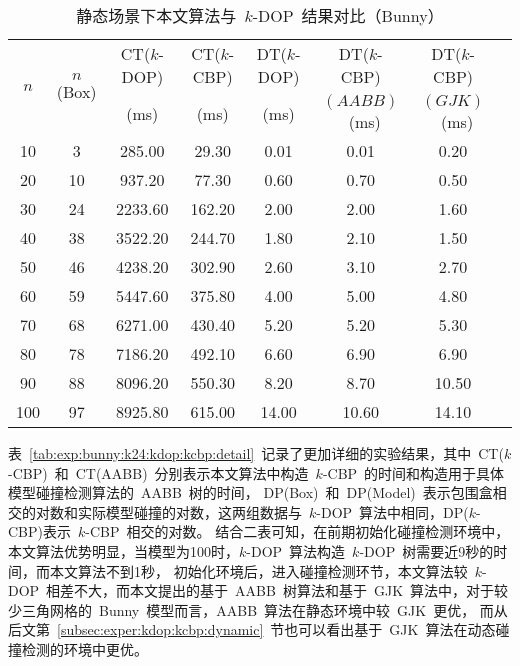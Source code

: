\begin{table}[H]  
\centering
\caption{静态场景下本文算法与~$k$-DOP~结果对比（Bunny）}
\label{tab:exp:bunny:k24:kdop:kcbp}
\begin{tabular}{cccccccc}
\toprule[1.5pt]
\multirow{2}{*}{$n$} & \multirow{2}{*}{$n$(Box)} & CT($k$-DOP) &  CT($k$-CBP) & DT($k$-DOP) & DT($k$-CBP) & DT($k$-CBP) \\%
                     &                         &  (ms)        & (ms)         & (ms)        & $(AABB)$~(ms) & $(GJK)$~(ms)       \\
\midrule[1.0pt]
10 & 3 &	285.00 &	29.30      &0.01 &	0.01  & 	0.20  \\ %
20 & 10&	937.20 &	77.30      &0.60 &	0.70  & 	0.50  \\ %
30 & 24&	2233.60&	162.20     &2.00 &	2.00  & 	1.60  \\ %
40 & 38&	3522.20&	244.70     &1.80 &	2.10  & 	1.50  \\ %
50 & 46&	4238.20&	302.90     &2.60 &	3.10  & 	2.70  \\ %
60 & 59&	5447.60&	375.80     &4.00 &	5.00  & 	4.80  \\ %
70 & 68&	6271.00&	430.40     &5.20 &	5.20  & 	5.30  \\ %
80 & 78&	7186.20&	492.10     &6.60 &	6.90  & 	6.90  \\ %
90 & 88&	8096.20&	550.30     &8.20 &	8.70  & 	10.50 \\ %
100& 97&	8925.80&	615.00     &14.00&	10.60 & 	14.10 \\ %
\bottomrule[1.5pt]
\end{tabular}
\end{table}

表~\ref{tab:exp:bunny:k24:kdop:kcbp:detail}~记录了更加详细的实验结果，其中~CT($k$-CBP)~和~CT(AABB)~分别表示本文算法中构造~$k$-CBP~的时间和构造用于具体模型碰撞检测算法的~AABB~树的时间，
DP(Box)~和~DP(Model)~表示包围盒相交的对数和实际模型碰撞的对数，这两组数据与~$k$-DOP~算法中相同，DP($k$-CBP)表示~$k$-CBP~相交的对数。
结合二表可知，在前期初始化碰撞检测环境中，本文算法优势明显，当模型为100时，$k$-DOP~算法构造~$k$-DOP~树需要近9秒的时间，而本文算法不到1秒，
初始化环境后，进入碰撞检测环节，本文算法较~$k$-DOP~相差不大，而本文提出的基于~AABB~树算法和基于~GJK~算法中，对于较少三角网格的~Bunny~模型而言，AABB~算法在静态环境中较~GJK~更优，
而从后文第~\ref{subsec:exper:kdop:kcbp:dynamic}~节也可以看出基于~GJK~算法在动态碰撞检测的环境中更优。 

